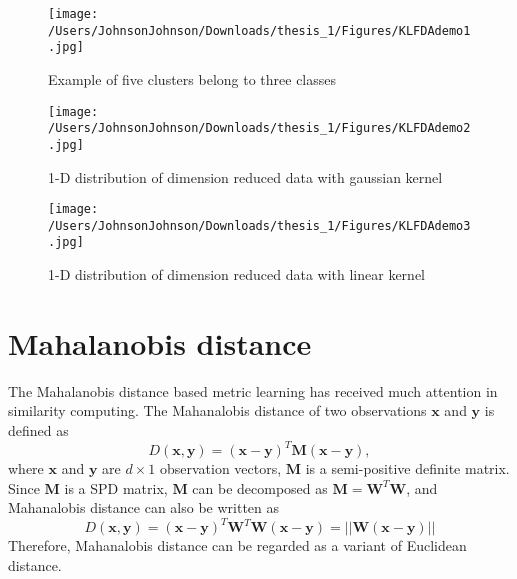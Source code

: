 \begin{figure}[H]
\centering
\texttt{[image: /Users/JohnsonJohnson/Downloads/thesis\_1/Figures/KLFDAdemo1.jpg]}
\caption{Example of five clusters belong to three classes}
\label{KLFDAdemo1}
\vspace{0em}
\end{figure} 


\begin{figure}[H]
\centering
\texttt{[image: /Users/JohnsonJohnson/Downloads/thesis\_1/Figures/KLFDAdemo2.jpg]}
\caption{1-D distribution of dimension reduced data  with gaussian kernel}
\label{KLFDAdemo2}
\vspace{-1em}
\end{figure} 


\begin{figure}[H]
\centering
\texttt{[image: /Users/JohnsonJohnson/Downloads/thesis\_1/Figures/KLFDAdemo3.jpg]}
\caption{1-D distribution of dimension reduced data  with linear kernel}
\label{KLFDAdemo3}
\vspace{-1em}
\end{figure} 


\section{Mahalanobis distance}
The Mahalanobis distance \cite{Mahadist} based metric learning has received much attention in similarity computing. The Mahanalobis distance of two observations $\bm{x} $ and $\bm{y}$ is defined as
\begin{equation}
D(\bm{x},\bm{y}) = (\bm{x} - \bm{y})^T\bm{M}(\bm{x} - \bm{y}), 
\end{equation}
where $\bm{x}$ and $\bm{y} $ are $d\times1$ observation vectors, $\bm{M}$ is a semi-positive definite matrix. Since $\bm{M}$ is a SPD matrix, $\bm{M}$ can be decomposed as $\bm{M} = \bm{W}^T\bm{W}$, and Mahanalobis distance can also be written as 
\begin{equation}
D(\bm{x},\bm{y}) = (\bm{x} - \bm{y})^T\bm{W}^T\bm{W}(\bm{x} - \bm{y})= ||\bm{W}(\bm{x} - \bm{y})||
\end{equation}
 Therefore, Mahanalobis distance can be regarded as a variant of Euclidean distance.
 
